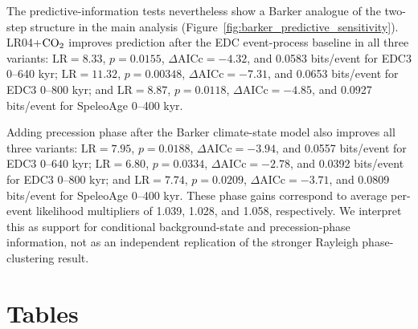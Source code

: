 \documentclass[11pt]{article}
\begin{document}
The predictive-information tests nevertheless show a Barker analogue of the two-step structure in the main analysis (Figure~\ref{fig:barker_predictive_sensitivity}). LR04+\(\ce{CO2}\) improves prediction after the EDC event-process baseline in all three variants: \(\mathrm{LR}=8.33\), \(p=0.0155\), \(\Delta\mathrm{AICc}=-4.32\), and 0.0583 bits/event for EDC3 0--640 kyr; \(\mathrm{LR}=11.32\), \(p=0.00348\), \(\Delta\mathrm{AICc}=-7.31\), and 0.0653 bits/event for EDC3 0--800 kyr; and \(\mathrm{LR}=8.87\), \(p=0.0118\), \(\Delta\mathrm{AICc}=-4.85\), and 0.0927 bits/event for SpeleoAge 0--400 kyr.

Adding precession phase after the Barker climate-state model also improves all three variants: \(\mathrm{LR}=7.95\), \(p=0.0188\), \(\Delta\mathrm{AICc}=-3.94\), and 0.0557 bits/event for EDC3 0--640 kyr; \(\mathrm{LR}=6.80\), \(p=0.0334\), \(\Delta\mathrm{AICc}=-2.78\), and 0.0392 bits/event for EDC3 0--800 kyr; and \(\mathrm{LR}=7.74\), \(p=0.0209\), \(\Delta\mathrm{AICc}=-3.71\), and 0.0809 bits/event for SpeleoAge 0--400 kyr. These phase gains correspond to average per-event likelihood multipliers of 1.039, 1.028, and 1.058, respectively. We interpret this as support for conditional background-state and precession-phase information, not as an independent replication of the stronger Rayleigh phase-clustering result.

\clearpage
\section*{Tables}
\end{document}

